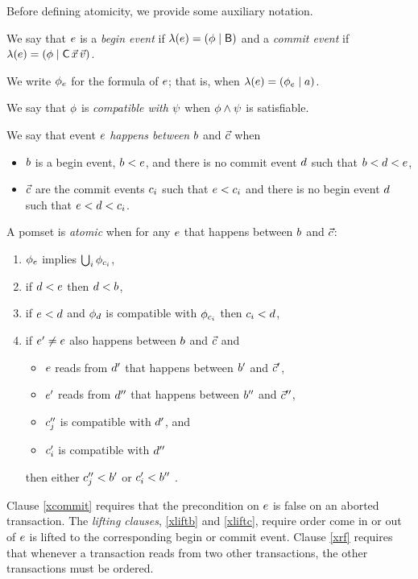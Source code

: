 Before defining atomicity, we provide some auxiliary notation.

We say that $e$ is a \emph{begin event} if
$\lambda(e)=(\phi\mid\mathsf{B})$ and a \emph{commit event} if
$\labelling(\aEv)=(\aForm\mid\DC{\vec\aLoc}{\vec\aVal})$.

We write $\phi_e$ for the formula of $e$; that is, when
$\lambda(e)=(\phi_e\mid a)$.

We say that $\phi$ is \emph{compatible with} $\psi$ when
$\phi\land\psi$ is satisfiable.

We say that  event $e$ \emph{happens between} $b$ and $\vec{c}$ when
\begin{itemize}
\item $b$ is a begin event, $b<e$, and
  there is no commit event $d$ such that $b<d<e$,
\item $\vec{c}$ are the commit events $c_i$ such that $e<c_i$ and
  there is no begin event $d$ such that $e<d<c_i$.
\end{itemize}

\begin{definition}
  A pomset is \emph{atomic} when for any $e$ that happens between $b$ and $\vec{c}$:
  \begin{enumerate}
  \item\label{xcommit} $\phi_{e}$ implies $\textstyle\bigcup_i\phi_{c_i}$,
  \item\label{xliftb} if $d<e$ then $d<b$, 
  \item\label{xliftc} if $e<d$ and $\phi_d$ is compatible with
    $\phi_{c_i}$ then $c_i<d$, 
  \item\label{xrf} if $e'\neq e$ also happens between $b$ and $\vec{c}$ and
    \begin{itemize}
    \item $e$ reads from $d'$ that happens between $b'$ and $\vec{c}'$,
    \item $e'$ reads from $d''$ that happens between $b''$ and $\vec{c}''$,
    \item $c''_j$ is compatible with $d'$, and 
    \item $c'_i$ is compatible with $d''$ 
    \end{itemize}
    then either
    $c''_j<b'$ or
    $c'_i<b''$ .
  \end{enumerate}
\end{definition}
Clause \eqref{xcommit} requires that the precondition on $e$ is false on an
aborted transaction.
The \emph{lifting clauses}, \eqref{xliftb} and \eqref{xliftc}, require order
come in or out of $e$ is lifted to the corresponding begin or commit event.
Clause \eqref{xrf} requires that whenever a transaction reads from two other
transactions, the other transactions must be ordered.

